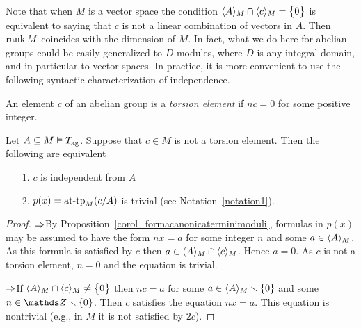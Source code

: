 Note that when $M$ is a vector space the condition $\<A\>_M\cap\<c\>_M=\big\{0\big\}$ is equivalent to saying that $c$ is not a linear combination of vectors in $A$.
%
Then $\rank M$ coincides with the dimension of $M$.
%
In fact, what we do here for abelian groups could be easily generalized to $D$-modules, where $D$ is any integral domain, and in particular to vector spaces.
%
In practice, it is more convenient to use the following syntactic characterization of independence.

An element $c$ of an abelian group is a \emph{torsion element} if $nc=0$ for some positive integer.

\begin{proposition}\label{prop_trivial_type_in_ag}
  Let $A\subseteq M\models T_{\rm ag}$.
  Suppose that $c\in M$ is not a torsion element.
  Then the following are equivalent
  \begin{itemize}
  \item[1.] $c$ is independent from $A$
  \item[2.] $p(x)=\attp_M(c/A)$ is trivial (see Notation~\ref{notation1}).
  \end{itemize}
\end{proposition}
\begin{proof}
  $\IMP$\quad By Proposition~\ref{corol_formacanonicaterminimoduli}, formulas in $p(x)$ may be assumed to have the form $nx=a$ for some integer $n$ and some $a\in\<A\>_M$.
  As this formula is satisfied by $c$ then $a\in\<A\>_M\cap\<c\>_M$.
  Hence $a=0$.
  As $c$ is not a torsion element, $n=0$ and the equation is trivial.

  $\IMP$\quad If $\<A\>_M\cap\<c\>_M\neq\big\{0\big\}$ then $nc=a$ for some $a\in\<A\>_M\sm\{0\}$ and some $n\in\ZZ\sm\{0\}$.
  Then $c$ satisfies the equation $nx=a$.
  This equation is nontrivial (e.g., in $M$ it is not satisfied by $2c$).
\end{proof}

